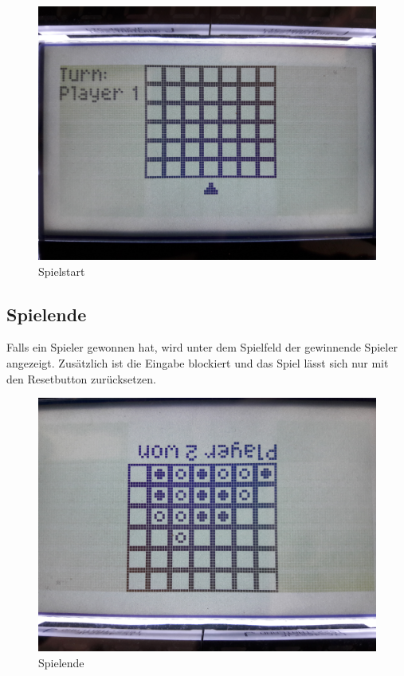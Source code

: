         \begin{figure}[H]
            \centering
            \includegraphics[width=\textwidth]{img/start.jpg}    
            \caption{Spielstart}
        \end{figure}

    \subsection{Spielende}
        Falls ein Spieler gewonnen hat, wird unter dem Spielfeld der gewinnende Spieler angezeigt.
        Zusätzlich ist die Eingabe blockiert und das Spiel lässt sich nur mit den Resetbutton zurücksetzen.

        \begin{figure}[H]
            \centering
            \includegraphics[width=\textwidth, angle=180]{img/player_2_won.jpg}    
            \caption{Spielende}
        \end{figure}




